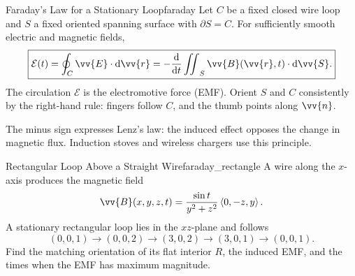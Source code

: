 \begin{theorem}{Faraday's Law for a Stationary Loop}{faraday}
Let $C$ be a fixed closed wire loop and $S$ a fixed oriented spanning surface with $\partial S = C$. For sufficiently smooth electric and magnetic fields,
\[
    \boxed{\mathcal{E}(t) = \oint_C \vv{E}\cdot\dd{\vv{r}}
    = -\frac{\dd{}}{\dd{t}}\iint_S \vv{B}(\vv{r},t)\cdot\dd{\vv{S}}.}
\]
The circulation $\mathcal{E}$ is the electromotive force (EMF). Orient $S$ and $C$ consistently by the right-hand rule: fingers follow $C$, and the thumb points along $\vv{n}$.
\end{theorem}

The minus sign expresses Lenz's law: the induced effect opposes the change in magnetic flux. Induction stoves and wireless chargers use this principle.

\begin{problem}{Rectangular Loop Above a Straight Wire}{faraday_rectangle}
A wire along the $x$-axis produces the magnetic field
\[
    \vv{B}(x,y,z,t) = \frac{\sin t}{y^2 + z^2}\ang{0,-z,y}.
\]
A stationary rectangular loop lies in the $xz$-plane and follows
\[
    (0,0,1) \to (0,0,2) \to (3,0,2) \to (3,0,1) \to (0,0,1).
\]
Find the matching orientation of its flat interior $R$, the induced EMF, and the times when the EMF has maximum magnitude.
\end{problem}

\begin{center}
\end{center}

